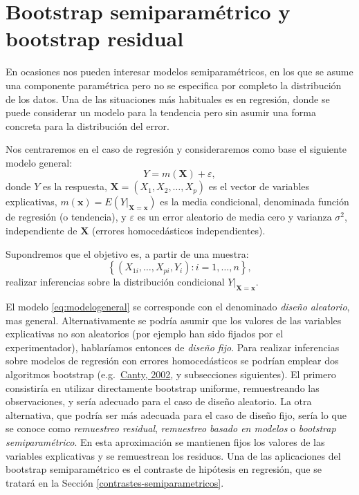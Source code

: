 \documentclass[
]{book}
\renewcommand{\mathbf}[1]{\symbf{#1}}
\theoremstyle{break}
\theoremstyle{nonumberplain}
\begin{document}
\section{Bootstrap semiparamétrico y bootstrap residual}\label{boot-reg}

En ocasiones nos pueden interesar modelos semiparamétricos, en los que se asume una componente paramétrica pero no se especifica por completo la distribución de los datos.
Una de las situaciones más habituales es en regresión, donde se puede considerar un modelo para la tendencia pero sin asumir una forma concreta para la distribución del error.

Nos centraremos en el caso de regresión y consideraremos como base el siguiente modelo general:
\begin{equation} 
  Y = m(\mathbf{X}) + \varepsilon,
  \label{eq:modelogeneral}
\end{equation}
donde \(Y\) es la respuesta, \(\mathbf{X}=(X_1, X_2, \ldots, X_p)\) es el vector de variables explicativas, \(m(\mathbf{x}) = E\left( \left. Y\right\vert_{\mathbf{X}=\mathbf{x}} \right)\) es la media condicional, denominada función de regresión (o tendencia), y \(\varepsilon\) es un error aleatorio de media cero y varianza \(\sigma^2\), independiente de \(\mathbf{X}\) (errores homocedásticos independientes).

Supondremos que el objetivo es, a partir de una muestra:
\[\left\{ \left( X_{1i}, \ldots, X_{pi}, Y_{i} \right)  : i = 1, \ldots, n \right\},\]
realizar inferencias sobre la distribución condicional
\(\left.Y \right\vert_{\mathbf{X}=\mathbf{x}}\).

El modelo \eqref{eq:modelogeneral} se corresponde con el denominado \emph{diseño aleatorio}, mas general.
Alternativamente se podría asumir que los valores de las variables explicativas no son aleatorios (por ejemplo han sido fijados por el experimentador), hablaríamos entonces de \emph{diseño fijo}.
Para realizar inferencias sobre modelos de regresión con errores homocedásticos se podrían emplear dos algoritmos bootstrap (e.g.~\href{http://cran.fhcrc.org/doc/Rnews/Rnews_2002-3.pdf}{Canty, 2002}, y subsecciones siguientes).
El primero consistiría en utilizar directamente bootstrap uniforme, remuestreando las observaciones, y sería adecuado para el caso de diseño aleatorio.
La otra alternativa, que podría ser más adecuada para el caso de diseño fijo, sería lo que se conoce como \emph{remuestreo residual}, \emph{remuestreo basado en modelos} o \emph{bootstrap semiparamétrico}.
En esta aproximación se mantienen fijos los valores de las variables explicativas y se remuestrean los residuos.
Una de las aplicaciones del bootstrap semiparamétrico es el contraste de hipótesis en regresión, que se tratará en la Sección \ref{contrastes-semiparametricos}.
\end{document}
